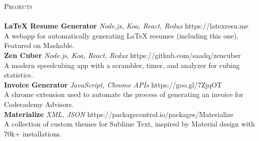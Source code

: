 \documentclass[a4paper]{article}
\newcommand{\lineunder} {
    \vspace*{-8pt} \\
    \hspace*{-18pt} \hrulefill \\
}
\newcommand{\header} [1] {
    {\hspace*{-18pt}\vspace*{6pt} \textsc{#1}}
    \vspace*{-6pt} \lineunder
}
\begin{document}
\header{Projects}
{\textbf{LaTeX Resume Generator} \sl Node.js, Koa, React, Redux} \hfill https://latexresu.me\\
A webapp for automatically generating LaTeX resumes (including this one). Featured on Mashable.\\
\vspace*{2mm}
{\textbf{Zen Cuber} \sl Node.js, Koa, React, Redux} \hfill https://github.com/saadq/zencuber\\
A modern speedcubing app with a scrambler, timer, and analyzer for cubing statistics.\\
\vspace*{2mm}
{\textbf{Invoice Generator} \sl JavaScript, Chrome APIs} \hfill https://goo.gl/7ZjqOT\\
A chrome extension used to automate the process of generating an invoice for Codecademy Advisors.\\
\vspace*{2mm}
{\textbf{Materialize} \sl XML, JSON} \hfill https://packagecontrol.io/packages/Materialize\\
A collection of custom themes for Sublime Text, inspired by Material design with 70k+ installations.\\
\vspace*{2mm}

\vspace*{2mm}



\
\end{document}
